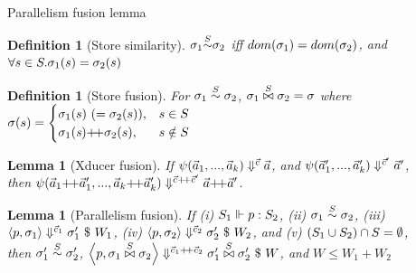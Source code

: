 \documentclass{beamer}
\newtheorem{lem}[thm]{Lemma}
\newtheorem{defi}[thm]{Definition}
\begin{document}
\begin{frame}{Parallelism fusion lemma}
\small
\begin{defi}[Store similarity]	
	$\sgm_1 {\~{\S}} \sgm_2 $ iff $dom(\sgm_1) = dom(\sgm_2)$, and $\forall s \in \S.\sgm_1(s)= \sgm_2(s)$ \\
\end{defi}

\begin{defi}[Store fusion]
	For $\sgm_1 \~\S \sgm_2$,
	$\sgm_1 \x{\S} \sgm_2 = \sgm$ where
	$\sgm(s) =
	\begin{cases}
	\sgm_1(s) \ (=\sgm_2(s)), & s \in \S\\
	\sgm_1(\s) {\++} \sgm_2(s), & s \notin \S \\
	\end{cases} $
\end{defi}

\begin{lem}[Xducer fusion] 
	If  $\sevalfg{\lcall}{\a_{1},...,\a_{k}}{\c}{\a}$, and $\sevalfg{\lcall}{\a'_{1},...,\a'_{k}}{\c'}{\a'}$, \\
	then $\sevalfg{\lcall}{\a_{1} {\++} \a'_{1},...,\a_{k} {\++} \a'_{k}}{\c {\++} \c'}{\a {\++} \a'}$.
\end{lem}

\begin{lem} [Parallelism fusion]
	If (i) $\wf{p}{\S_1}{\S_2}$, (ii) $\sgm_1 \~{\S} \sgm_2$,  (iii) $\seval{p}{\sgm_1}{\c_1}{\sgm_1'}{W_1}$, (iv) $\seval{p}{\sgm_2} {\c_2} {\sgm_2'}{W_2}$, and (v) $(\S_1 \cup \S_2) \cap \S = \emptyset $, \\
	then $\sgm_1' \~\S \sgm_2'$, $\seval{p}{\sgm_1 \x\S \sgm_2}{\c_1 {\++} \c_2}{ \sgm_1' \x\S \sgm_2' }{W}$, and $W \le W_1 + W_2$
\end{lem}


\end{frame}
\end{document}
